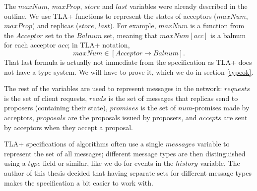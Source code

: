 \documentclass[12pt,a4paper,en]{pracamgr}
\begin{document}
The $maxNum$, $maxProp$, $store$ and $last$ variables were already described in the outline. We use TLA+ functions to represent the states of acceptors ($maxNum$, $maxProp$) and replicas ($store$, $last$). For example, $maxNum$ is a function from the $Acceptor$ set to the $Balnum$ set, meaning that $maxNum[acc]$ is a balnum for each acceptor $acc$; in TLA+ notation,
$$ maxNum \in [Acceptor \rightarrow Balnum]. $$
That last formula is actually not immediate from the specification as TLA+ does not have a type system. We will have to prove it, which we do in section \ref{typeok}.

The rest of the variables are used to represent messages in the network: $requests$ is the set of client requests, $reads$ is the set of messages that replicas send to proposers (containing their state), $promises$ is the set of $num$-promises made by acceptors, $proposals$ are the proposals issued by proposers, and $accepts$ are sent by acceptors when they accept a proposal.

TLA+ specifications of algorithms often use a single $messages$ variable to represent the set of all messages; different message types are then distinguished using a $type$ field or similar, like we do for events in the $history$ variable. The author of this thesis decided that having separate sets for different message types makes the specification a bit easier to work with.
\end{document}
